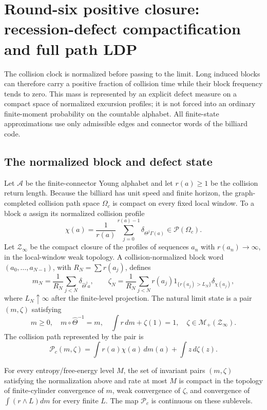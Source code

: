 \section{Round-six positive closure: recession-defect compactification and full path LDP}
\label{sec:r6-a3}

The collision clock is normalized before passing to the limit.  Long induced
blocks can therefore carry a positive fraction of collision time while their
block frequency tends to zero.  This mass is represented by an explicit
defect measure on a compact space of normalized excursion profiles; it is not
forced into an ordinary finite-moment probability on the countable alphabet.
All finite-state approximations use only admissible edges and connector words
of the billiard code.

\subsection{The normalized block and defect state}

Let \(\mathcal A\) be the finite-connector Young alphabet and let
\(r(a)\ge1\) be the collision return length.  Because the billiard has unit
speed and finite horizon, the graph-completed collision path space
\(\Omega_c\) is compact on every fixed local window.  To a block \(a\) assign
its normalized collision profile
\[
\chi(a)=\frac1{r(a)}\sum_{j=0}^{r(a)-1}
\delta_{\Theta^j\Gamma(a)}\in\mathcal P(\Omega_c).
\]
Let \(\mathcal Z_\infty\) be the compact closure of the profiles of sequences
\(a_n\) with \(r(a_n)\to\infty\), in the local-window weak topology.  A
collision-normalized block word \((a_0,\ldots,a_{N-1})\), with
\(R_N=\sum r(a_j)\), defines
\[
m_N=\frac1{R_N}\sum_{j<N}\delta_{\widehat\Theta^ja},
\qquad
\zeta_N=\frac1{R_N}
\sum_{j<N}r(a_j)1_{\{r(a_j)>L_N\}}\delta_{\chi(a_j)},
\]
where \(L_N\uparrow\infty\) after the finite-level projection.  The natural
limit state is a pair \((m,\zeta)\) satisfying
\[
 m\ge0,\quad m\circ\widehat\Theta^{-1}=m,\quad
 \int r\,dm+\zeta(1)=1,\quad
 \zeta\in\mathcal M_+(\mathcal Z_\infty).
\]
The collision path represented by the pair is
\[
\mathscr P_c(m,\zeta)
=\int r(a)\chi(a)\,dm(a)+\int z\,d\zeta(z).
\]

\begin{lemma}
\label{lem:r6-a3-compact}
For every entropy/free-energy level \(M\), the set of invariant pairs
\((m,\zeta)\) satisfying the normalization above and rate at most \(M\) is
compact in the topology of finite-cylinder convergence of \(m\), weak
convergence of \(\zeta\), and convergence of \(\int(r\wedge L)dm\) for every
finite \(L\).  The map \(\mathscr P_c\) is continuous on these sublevels.
\end{lemma}

